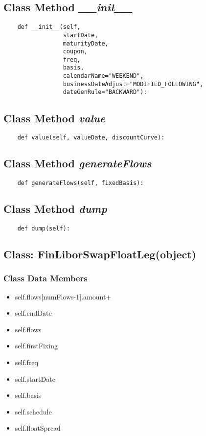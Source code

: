 \documentclass[twoside,11pt]{book}
\begin{document}
\subsection{Class Method {\it \_\_init\_\_}}


\begin{lstlisting}
    def __init__(self,
                 startDate,
                 maturityDate,
                 coupon,
                 freq,
                 basis,
                 calendarName="WEEKEND",
                 businessDateAdjust="MODIFIED_FOLLOWING",
                 dateGenRule="BACKWARD"):
\end{lstlisting}

\subsection{Class Method {\it value}}


\begin{lstlisting}
    def value(self, valueDate, discountCurve):
\end{lstlisting}

\subsection{Class Method {\it generateFlows}}


\begin{lstlisting}
    def generateFlows(self, fixedBasis):
\end{lstlisting}

\subsection{Class Method {\it dump}}


\begin{lstlisting}
    def dump(self):
\end{lstlisting}

\subsection{Class: FinLiborSwapFloatLeg(object)}


\subsubsection{Class Data Members}
\begin{itemize}
\item{self.flows[numFlows-1].amount+}
\item{self.endDate}
\item{self.flows}
\item{self.firstFixing}
\item{self.freq}
\item{self.startDate}
\item{self.basis}
\item{self.schedule}
\item{self.floatSpread}
\end{itemize}
\end{document}
